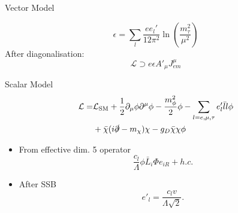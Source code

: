 \documentclass[11pt]{beamer}
\numberwithin{equation}{section}
\begin{document}
\begin{frame}{Vector Model}
\begin{figure}[H]
\centering
{}
\end{figure}
\pause
\begin{equation*}
\epsilon =\sum_l \frac{ee_l'}{12\pi^2}\ln\left(\frac{m_\tau^2}{\mu^2}\right)
\label{eq:KinMix}
\end{equation*}
\pause
After diagonalisation:
\begin{equation*}
\mathcal{L}\supset e\epsilon A'_\mu J_{em}^\mu
\end{equation*}
\end{frame}

\begin{frame}{Scalar Model}
\begin{align*}
\mathcal{L}=& \mathcal{L}_\text{SM}+\frac{1}{2}\partial_\mu \phi \partial^\mu \phi-\frac{m_{\phi}^2}{2}\phi -\sum_{l=e,\mu,\tau} e'_l\bar{l} l \phi \\&+\bar{\chi}(i\slashed{\partial}-m_\chi)\chi -g_D\bar{\chi}\chi\phi
\end{align*}
\begin{itemize}
\pause
\item From effective dim. 5 operator 
\begin{equation*}
\frac{c_l}{\Lambda}\phi \bar{L}_i\Phi e_{iR}+h.c.
\end{equation*} 
\pause
\item After SSB
\begin{equation*}
e'_l=\frac{c_l v}{\Lambda\sqrt{2}}.
\end{equation*}
\end{itemize}
\end{frame}
\end{document}
